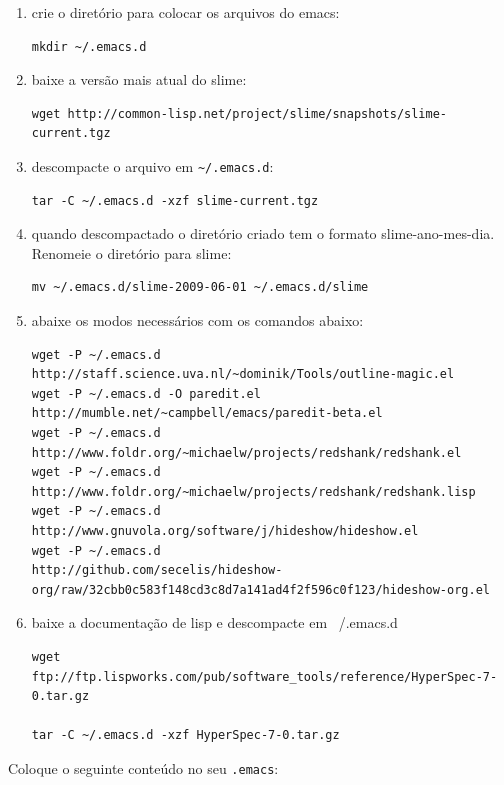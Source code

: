 \documentclass[12pt,brazil]{book}
\begin{document}
\begin{enumerate}
\item crie o diretório para colocar os arquivos do emacs:
\begin{verbatim}
mkdir ~/.emacs.d
\end{verbatim}
\item baixe a versão mais atual do slime:
\begin{verbatim}
wget http://common-lisp.net/project/slime/snapshots/slime-current.tgz
\end{verbatim}
\item descompacte o arquivo em \verb!~/.emacs.d!:
\begin{verbatim}
tar -C ~/.emacs.d -xzf slime-current.tgz
\end{verbatim}
\item quando descompactado o diretório criado tem o formato
  slime-ano-mes-dia. Renomeie o diretório para slime:
\begin{verbatim}
mv ~/.emacs.d/slime-2009-06-01 ~/.emacs.d/slime
\end{verbatim}
\item abaixe os modos necessários com os comandos abaixo:
\begin{verbatim}
wget -P ~/.emacs.d http://staff.science.uva.nl/~dominik/Tools/outline-magic.el
wget -P ~/.emacs.d -O paredit.el http://mumble.net/~campbell/emacs/paredit-beta.el
wget -P ~/.emacs.d http://www.foldr.org/~michaelw/projects/redshank/redshank.el
wget -P ~/.emacs.d http://www.foldr.org/~michaelw/projects/redshank/redshank.lisp
wget -P ~/.emacs.d http://www.gnuvola.org/software/j/hideshow/hideshow.el
wget -P ~/.emacs.d
http://github.com/secelis/hideshow-org/raw/32cbb0c583f148cd3c8d7a141ad4f2f596c0f123/hideshow-org.el
\end{verbatim}
\item baixe a documentação de lisp e descompacte em ~/.emacs.d
\begin{verbatim}
wget
ftp://ftp.lispworks.com/pub/software_tools/reference/HyperSpec-7-0.tar.gz

tar -C ~/.emacs.d -xzf HyperSpec-7-0.tar.gz
\end{verbatim}
\end{enumerate}

Coloque o seguinte conteúdo no seu \texttt{.emacs}:
\end{document}
